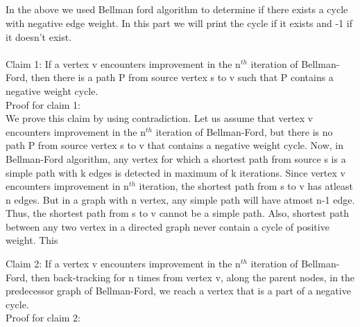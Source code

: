 \documentclass{article}
\begin{document}
\subsection{}
In the above we used Bellman ford algorithm to determine if there exists a cycle with negative edge weight. In this part we will print the cycle if it exists and -1 if it doesn't exist.
\\\\
Claim 1: If a vertex v encounters improvement in the n$^{th}$ iteration of Bellman-Ford, then there is a path P from source vertex s to v such that P contains a negative weight cycle.\\
Proof for claim 1:\\
We prove this claim by using contradiction. Let us assume that vertex v encounters improvement in the n$^{th}$ iteration of Bellman-Ford, but there is no path P from source vertex s to v that contains a negative weight cycle. %
Now, in Bellman-Ford algorithm, any vertex for which a shortest path from source s is a simple path with k edges is detected in maximum of k iterations. Since vertex v encounters improvement in n$^{th}$ iteration, the shortest path from s to v has atleast n edges. But in a graph with n vertex, any simple path will have atmost n-1 edge. Thus, the shortest path from s to v cannot be a simple path. Also, shortest path between any two vertex in a directed graph never contain a cycle of positive weight. This 

Claim 2: If a vertex v encounters improvement in the n$^{th}$ iteration of Bellman-Ford, then back-tracking for n times from vertex v, along the parent nodes, in the predecessor graph of Bellman-Ford, we reach a vertex that is a part of a negative cycle.\\
Proof for claim 2:\\
\end{document}
